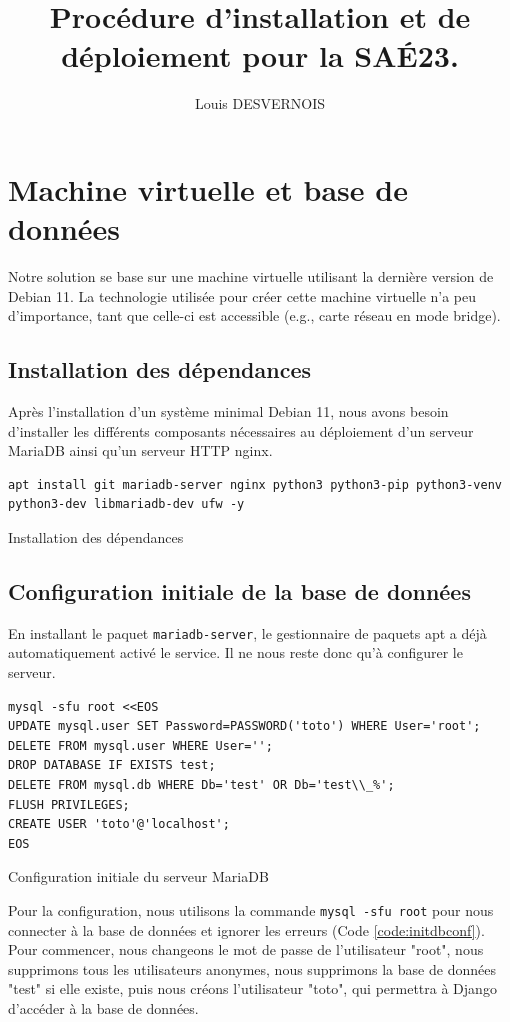 \documentclass{article}
\author{Louis DESVERNOIS}
\title{Procédure d'installation et de déploiement pour la SAÉ23.}
\begin{document}
\maketitle
\tableofcontents
\listoffigures
\listoflistings
\newpage
\section{Machine virtuelle et base de données}
    Notre solution se base sur une machine virtuelle utilisant la dernière version de Debian 11. La technologie utilisée pour créer cette machine virtuelle n'a peu d'importance, tant que celle-ci est accessible (e.g., carte réseau en mode bridge). 

        \subsection{Installation des dépendances}
        Après l'installation d'un système minimal Debian 11, nous avons besoin d'installer les différents composants nécessaires au déploiement d'un serveur MariaDB ainsi qu'un serveur HTTP nginx.
        \begin{listing}[H]
            \begin{verbatim}
apt install git mariadb-server nginx python3 python3-pip python3-venv python3-dev libmariadb-dev ufw -y
            \end{verbatim}
            \caption{Installation des dépendances}
            \label{code:deps-install}
        \end{listing}

        \subsection{Configuration initiale de la base de données}
        En installant le paquet \verb|mariadb-server|, le gestionnaire de paquets apt a déjà automatiquement activé le service. Il ne nous reste donc qu'à configurer le serveur.
        \begin{listing}[H]
            \begin{verbatim}
mysql -sfu root <<EOS
UPDATE mysql.user SET Password=PASSWORD('toto') WHERE User='root';
DELETE FROM mysql.user WHERE User='';
DROP DATABASE IF EXISTS test;
DELETE FROM mysql.db WHERE Db='test' OR Db='test\\_%';
FLUSH PRIVILEGES;
CREATE USER 'toto'@'localhost';
EOS
            \end{verbatim}
            \caption{Configuration initiale du serveur MariaDB}
            \label{code:initdbconf}
        \end{listing}
        Pour la configuration, nous utilisons la commande \verb|mysql -sfu root| pour nous connecter à la base de données et ignorer les erreurs (Code \ref{code:initdbconf}). Pour commencer, nous changeons le mot de passe de l'utilisateur "root", nous supprimons tous les utilisateurs anonymes, nous supprimons la base de données "test" si elle existe, puis nous créons l'utilisateur "toto", qui permettra à Django d'accéder à la base de données.
\end{document}
